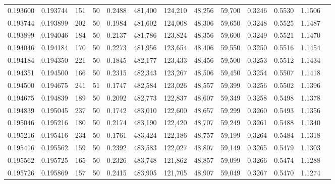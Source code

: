 \begin{tabular}{rrrrrrrrrrrrr}
0.193600 & 0.193744 &   151 &  50 &                                     0.2488 & 481,400 & 124,210 &  48,256 &  59,700 & 0.3246 & 0.5530 & 1.1506 \\
0.193744 & 0.193899 &   202 &  50 &                                     0.1984 & 481,602 & 124,008 &  48,306 &  59,650 & 0.3248 & 0.5525 & 1.1487 \\
0.193899 & 0.194046 &   184 &  50 &                                     0.2137 & 481,786 & 123,824 &  48,356 &  59,600 & 0.3249 & 0.5521 & 1.1470 \\
0.194046 & 0.194184 &   170 &  50 &                                     0.2273 & 481,956 & 123,654 &  48,406 &  59,550 & 0.3250 & 0.5516 & 1.1454 \\
0.194184 & 0.194350 &   221 &  50 &                                     0.1845 & 482,177 & 123,433 &  48,456 &  59,500 & 0.3253 & 0.5512 & 1.1434 \\
0.194351 & 0.194500 &   166 &  50 &                                     0.2315 & 482,343 & 123,267 &  48,506 &  59,450 & 0.3254 & 0.5507 & 1.1418 \\
0.194500 & 0.194675 &   241 &  51 &                                     0.1747 & 482,584 & 123,026 &  48,557 &  59,399 & 0.3256 & 0.5502 & 1.1396 \\
0.194675 & 0.194839 &   189 &  50 &                                     0.2092 & 482,773 & 122,837 &  48,607 &  59,349 & 0.3258 & 0.5498 & 1.1378 \\
0.194839 & 0.195045 &   237 &  50 &                                     0.1742 & 483,010 & 122,600 &  48,657 &  59,299 & 0.3260 & 0.5493 & 1.1356 \\
0.195046 & 0.195216 &   180 &  50 &                                     0.2174 & 483,190 & 122,420 &  48,707 &  59,249 & 0.3261 & 0.5488 & 1.1340 \\
0.195216 & 0.195416 &   234 &  50 &                                     0.1761 & 483,424 & 122,186 &  48,757 &  59,199 & 0.3264 & 0.5484 & 1.1318 \\
0.195416 & 0.195562 &   159 &  50 &                                     0.2392 & 483,583 & 122,027 &  48,807 &  59,149 & 0.3265 & 0.5479 & 1.1303 \\
0.195562 & 0.195725 &   165 &  50 &                                     0.2326 & 483,748 & 121,862 &  48,857 &  59,099 & 0.3266 & 0.5474 & 1.1288 \\
0.195726 & 0.195869 &   157 &  50 &                                     0.2415 & 483,905 & 121,705 &  48,907 &  59,049 & 0.3267 & 0.5470 & 1.1274 \\

\end{tabular}
